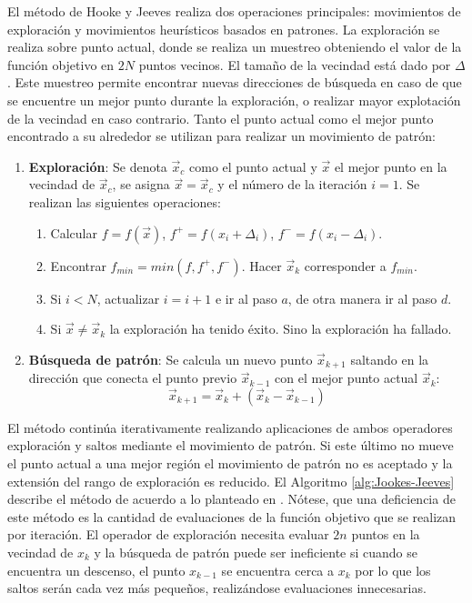  El método de Hooke y Jeeves realiza dos operaciones principales: movimientos de exploración y movimientos heurísticos basados en patrones. La exploración se realiza sobre punto actual, donde se realiza un muestreo obteniendo el valor de la función objetivo en $2N$ puntos vecinos. El tamaño de la vecindad está dado por $\Delta$. Este muestreo permite encontrar nuevas direcciones de búsqueda en caso de que se encuentre un mejor punto durante la exploración, o realizar mayor explotación de la vecindad en caso contrario. Tanto el punto actual como el mejor punto encontrado a su alrededor se utilizan para realizar un movimiento de patrón:
\begin{enumerate}
\item \textbf{Exploración}: Se denota $\vec{x}_c$ como el punto actual y $\vec{x}$ el mejor punto en la vecindad de $\vec{x}_c$, se asigna $\vec{x}=\vec{x}_c$ y el número de la iteración $i=1$. Se realizan las siguientes operaciones:
\begin{enumerate}
\item Calcular $f=f(\vec{x})$, $f^+=f(x_i+ \Delta_i)$, $f^-=f(x_i- \Delta_i)$.
\item Encontrar $f_{min}= min(f,f^+,f^-)$. Hacer $\vec{x}_k$ corresponder a $f_{min}$.
\item Si $i<N$, actualizar $i=i+1$ e ir al paso $a$, de otra manera ir al paso $d$. 
\item Si $\vec{x} \neq \vec{x}_k$ la exploración ha tenido éxito. Sino la exploración ha fallado. \\ 
\end{enumerate}

\item \textbf{Búsqueda de patrón}: Se calcula un nuevo punto $\vec{x}_{k+1}$ saltando en la dirección que conecta el punto previo $\vec{x}_{k-1}$ con el mejor punto actual $\vec{x}_k$:
\begin{equation}
\vec{x}_{k+1}=\vec{x}_{k}+(\vec{x}_{k}-\vec{x}_{k-1})
\end{equation}
\end{enumerate}
El método continúa iterativamente realizando aplicaciones de ambos operadores exploración y saltos mediante el movimiento de patrón. Si este último no mueve el punto actual a una mejor región el movimiento de patrón no es aceptado y la extensión del rango de exploración es reducido. El Algoritmo \ref{alg:Jookes-Jeeves} describe el método de acuerdo a lo planteado en \cite{deb_optimization_2004}. Nótese, que una deficiencia de este método es la cantidad de evaluaciones de la función objetivo que se realizan por iteración. El operador de exploración necesita evaluar $2n$ puntos en la vecindad de $x_k$ y la búsqueda de patrón puede ser ineficiente si cuando se encuentra un descenso, el punto $x_{k-1}$ se encuentra cerca a $x_k$ por lo que los saltos serán cada vez más pequeños, realizándose evaluaciones innecesarias. 

